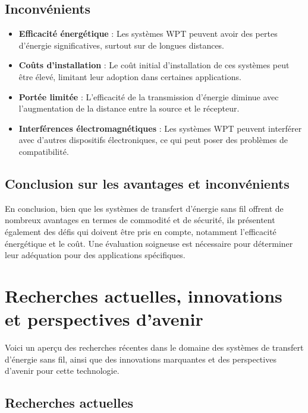 \documentclass[12pt,a4paper,titlepage,notitlepage]{article}
\begin{document}
	\subsection{Inconvénients}
	
	\begin{itemize}
		\item \textbf{Efficacité énergétique} : Les systèmes WPT peuvent avoir des pertes d'énergie significatives, surtout sur de longues distances.
		\item \textbf{Coûts d'installation} : Le coût initial d'installation de ces systèmes peut être élevé, limitant leur adoption dans certaines applications.
		\item \textbf{Portée limitée} : L'efficacité de la transmission d'énergie diminue avec l'augmentation de la distance entre la source et le récepteur.
		\item \textbf{Interférences électromagnétiques} : Les systèmes WPT peuvent interférer avec d'autres dispositifs électroniques, ce qui peut poser des problèmes de compatibilité.
	\end{itemize}
	
	\subsection{Conclusion sur les avantages et inconvénients}
	
	En conclusion, bien que les systèmes de transfert d'énergie sans fil offrent de nombreux avantages en termes de commodité et de sécurité, ils présentent également des défis qui doivent être pris en compte, notamment l'efficacité énergétique et le coût. Une évaluation soigneuse est nécessaire pour déterminer leur adéquation pour des applications spécifiques.
	
	\section{Recherches actuelles, innovations et perspectives d'avenir}
	
	Voici un aperçu des recherches récentes dans le domaine des systèmes de transfert d'énergie sans fil, ainsi que des innovations marquantes et des perspectives d'avenir pour cette technologie.
	
	\subsection{Recherches actuelles}
	
\end{document}
